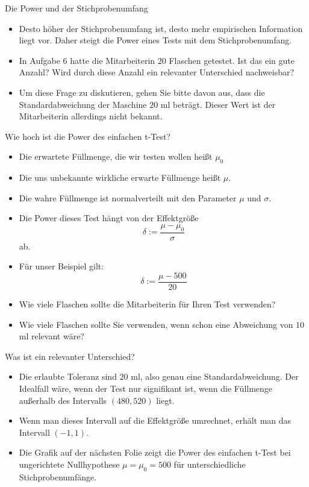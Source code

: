 \documentclass[usenames,dvipsnames,handout]{beamer}
\begin{document}
\begin{frame}{Die Power und der Stichprobenumfang}
\begin{itemize}
\item{Desto höher der Stichprobenumfang ist, desto mehr empirischen Information liegt vor. Daher steigt die
Power eines Tests mit dem Stichprobenumfang.}\pause
\item{In Aufgabe 6 hatte die Mitarbeiterin 20 Flaschen getestet. Ist das ein gute Anzahl?
Wird durch diese Anzahl ein relevanter Unterschied nachweisbar?}
\item{Um diese Frage zu diskutieren, gehen Sie bitte davon aus, dass die Standardabweichung der Maschine $20$ ml beträgt.
Dieser Wert ist der Mitarbeiterin allerdings nicht bekannt.}
\end{itemize}
\end{frame}

\begin{frame}{Wie hoch ist die Power des einfachen t-Test?}
\begin{itemize}
\item{Die erwartete  Füllmenge, die wir testen wollen heißt $\mu_{0}$}\pause
\item{Die uns unbekannte wirkliche erwarte Füllmenge heißt $\mu.$}\pause
\item{Die wahre Füllmenge ist normalverteilt mit den Parameter $\mu$ und $\sigma.$}\pause
\item{Die Power dieses Test hängt von der Effektgröße $$\delta:=\frac{\mu-\mu_{0}}{\sigma}$$ ab.}\pause
\item{Für unser Beispiel gilt: $$\delta:=\frac{\mu-500}{20}$$}\pause
\item{Wie viele Flaschen sollte die Mitarbeiterin für Ihren Test verwenden?}\pause
\item{Wie viele Flaschen sollte Sie verwenden, wenn schon eine Abweichung von $10$ ml relevant wäre?}
\end{itemize}
\end{frame}

\begin{frame}{Was ist ein relevanter Unterschied?}
\begin{itemize}
\item{Die erlaubte Toleranz sind $20$ ml, also genau eine Standardabweichung.
Der Idealfall wäre, wenn der Test nur signifikant ist, wenn die Füllmenge
außerhalb des Intervalls $(480,520)$ liegt.}\pause
\item{Wenn man dieses Intervall auf die Effektgröße umrechnet, erhält man 
das Intervall $(-1,1).$}
\item{Die Grafik auf der nächsten Folie zeigt die Power des einfachen t-Test bei ungerichtete Nullhypothese $\mu=\mu_{0}=500$
für unterschiedliche Stichprobenumfänge.}
\end{itemize}
\end{frame}
\end{document}
